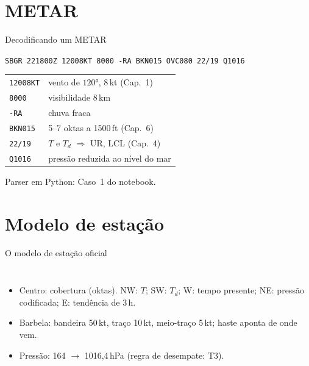\documentclass[aspectratio=169,11pt]{beamer}
\begin{document}
\section{METAR}

\begin{frame}[fragile]{Decodificando um METAR}
  \begin{center}
  \texttt{SBGR 221800Z 12008KT 8000 -RA BKN015 OVC080 22/19 Q1016}
  \end{center}
  \vspace{0.4em}
  \centering
  \begin{tabular}{ll}
    \hline
    \texttt{12008KT} & vento \alert{de} $120°$, 8\,kt (Cap.~1) \\
    \texttt{8000} & visibilidade 8\,km \\
    \texttt{-RA} & chuva fraca \\
    \texttt{BKN015} & 5--7 oktas a 1500\,ft (Cap.~6) \\
    \texttt{22/19} & $T$ e $T_d$ $\Rightarrow$ UR, LCL (Cap.~4) \\
    \texttt{Q1016} & pressão reduzida ao nível do mar \\
    \hline
  \end{tabular}
  \vspace{0.5em}

  Parser em Python: Caso~1 do notebook.
\end{frame}

\section{Modelo de estação}

\begin{frame}{O modelo de estação oficial}
  \begin{columns}
    \begin{itemize}
      \item Centro: cobertura (oktas). NW: $T$; SW: $T_d$; W: tempo
            presente; NE: pressão codificada; E: tendência de 3\,h.
      \item Barbela: bandeira 50\,kt, traço 10\,kt, meio-traço 5\,kt;
            haste aponta \alert{de onde} vem.
      \item Pressão: 164 $\to$ 1016{,}4\,hPa (regra de desempate: T3).
    \end{itemize}
  \end{columns}
\end{frame}
\end{document}
